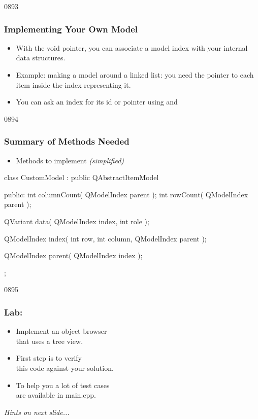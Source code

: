 \begin{slide}{0893}\frametitle{Implementing Your Own Model
   }\label{model_indexes_end}
\begin{itemize}
\item With the void pointer, you can associate a model index with your internal
  data structures.
\item Example: making a model around a linked list: you need the pointer to each
  item inside the index representing it.
\item You can ask an index for its id or pointer using
   and 
\end{itemize}
\end{slide}

\begin{slide}[fragile]{0894}
  \frametitle{Summary of Methods Needed}
  \begin{itemize}
  \item Methods to implement \textit{(simplified)}
  \end{itemize}
  \begin{cpp}
class CustomModel : public QAbstractItemModel
{
public:
  int columnCount( QModelIndex parent );
  int rowCount( QModelIndex parent );

  QVariant data( QModelIndex index, int role );

  QModelIndex index( int row, int column, QModelIndex parent );

  QModelIndex parent( QModelIndex index );
};
\end{cpp}
\end{slide}
  
\begin{slide}{0895}\frametitle{Lab: }
\begin{itemize}
\item Implement an object browser \\ that uses
  a tree view.
\item First step is to verify \\ this code
  against your solution.
\item To help you a lot of test cases\\
 are available in main.cpp.
\end{itemize}

\textit{Hints on next slide...}


\end{slide}

